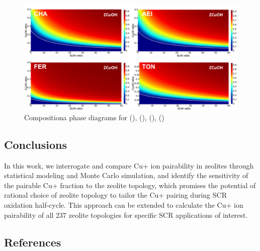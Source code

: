 \documentclass[12pt]{article}
\begin{document}
\begin{figure}[H]
\centering
  \includegraphics[width=5.2in]{./Figures/Figure-5}
  \caption{Compositiona phase diagrams for (), (), (), ()}
\end{figure}


\subsection*{Conclusions}

In this work, we interrogate and compare Cu+ ion pairability in zeolites through statistical modeling and Monte Carlo simulation, and identify the sensitivity of the pairable Cu+ fraction to the zeolite topology, which promises the potential of rational choice of zeolite topology to tailor the Cu+ pairing during SCR oxidation half-cycle. This approach can be extended to calculate the Cu+ ion pairability of all 237 zeolite topologies for specific SCR applications of interest. 

\subsection*{References}
{}

\end{document}
